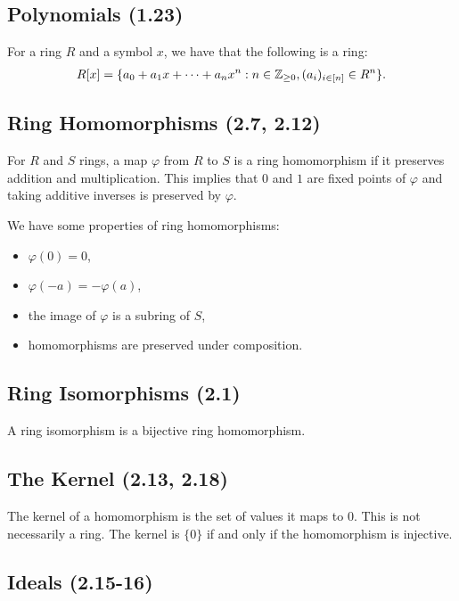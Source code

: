 \subsection{Polynomials (1.23)} \label{1.23}

For a ring $R$ and a symbol $x$, we have that the following is a ring: \begin{align*}
    R[x] = \{a_0 + a_1x + \cdots + a_nx^n : n \in \mathbb{Z}_{\geq 0}, (a_i)_{i \in [n]} \in R^n\}.
\end{align*} 

\subsection{Ring Homomorphisms (2.7, 2.12)} \label{2.7} \label{2.12}

For $R$ and $S$ rings, a map $\varphi$ from $R$ to $S$ is a ring
homomorphism if it preserves addition and multiplication.
This implies that $0$ and $1$ are fixed points of $\varphi$
and taking additive inverses is preserved by $\varphi$.

\newpage
\noindent
We have some properties of ring homomorphisms: \begin{itemize}
    \item $\varphi(0) = 0$,
    \item $\varphi(-a) = -\varphi(a)$,
    \item the image of $\varphi$ is a subring of $S$,
    \item homomorphisms are preserved under composition.
\end{itemize}

\subsection{Ring Isomorphisms (2.1)} \label{2.1}

A ring isomorphism is a bijective ring homomorphism.

\subsection{The Kernel (2.13, 2.18)} \label{2.13} \label{2.18}

The kernel of a homomorphism is the set of values it maps to $0$.
This is not necessarily a ring. The kernel is $\{0\}$ if and only
if the homomorphism is injective.

\subsection{Ideals (2.15-16)} \label{2.15} \label{2.16}


